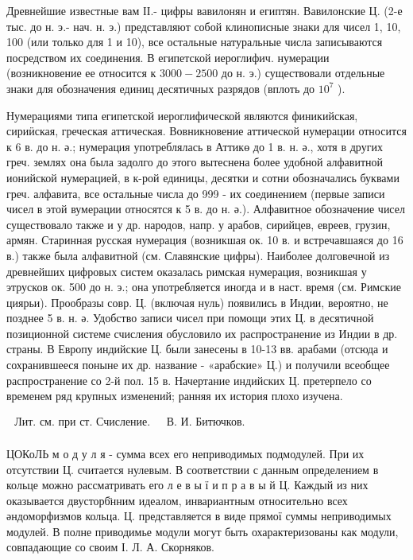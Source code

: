 \documentclass[10pt]{article}
\begin{document}
Древнейшие известные вам ІІ.- цифры вавилонян и египтян. Вавилонские Ц. (2-е тыс. до н. э.- нач. н. э.) представляют собой клинописные знаки для чисел 1, 10, 100 (или только для 1 и 10), все остальные натуральные числа записываются посредством их соединения. В египетской иероглифич. нумерации (возникновение ее относится к $3000-2500$ до н. э.) существовали отдельные знаки для обозначения единиц десятичных разрядов (вплоть до $10^{7}$ ).



Нумерациями типа египетской иероглифической являются финикийская, сириӥская, греческая аттическая. Вовникновение аттической нумерации относится к 6 в. до н. ә.; нумерация употреблялась в Аттикө до 1 в. н. ә., хотя в других греч. землях она была задолго до этого вытеснена более удобной алфавитной ионийской нумерацией, в к-рой единицы, десятки и сотни обозначались буквами греч. алфавита, все остальные числа до 999 - их соединением (первые записи чисел в этой вумерации относятся к 5 в. до н. ә.). Алфавитное обозначение чисел существовало также и у др. народов, напр. у арабов, сирийцев, евреев, грузин, армян. Старинная русская нумерация (возникшая ок. 10 в. и встречавшаяся до 16 в.) также была алфавитной (см. Славянские цифры). Наиболее долговечной из древнейших цифровых систем оказалась римская нумерация, возникшая у этрусков ок. 500 до н. э.; она употребляется иногда и в наст. время (см. Римские циярьи). Прообразы совр. Ц. (включая нуль) появились в Индии, вероятно, не позднее 5 в. н. ә. Удобство записи чисел при помощи этих Ц. в десятичной позиционной системе счисления обусловило их распространение из Индии в др. страны. В Европу индийские Ц. были занесены в 10-13 вв. арабами (отсюда и сохранившееся поныне их др. название - «арабские» Ц.) и получили всеобщее распространение со 2-й пол. 15 в. Начертание индийских Ц. претерпело со временем ряд крупных изменений; ранняя их история плохо изучена.



$\begin{array}{ll}\text { Лит. см. при ст. Счисление. } & \text { В. И. Битючков. } \\ \end{array}$



ЦОКоЛЬ м о д у л я - сумма всех его неприводимых подмодулей. При их отсутствии Ц. считается нулевым. В соответствии с данным определением в кольце можно рассматривать его л е в ы ї и п р а в ы й Ц. Каждый из них оказывается двусторб̈нним идеалом, инвариантным относительно всех әндоморфизмов кольца. Ц. представляется в виде прямої суммы неприводимых модулей. В полне приводимье модули могут быть охарактеризованы как модули, совпадающие со своим І. Л. А. Скорняков.
\end{document}
